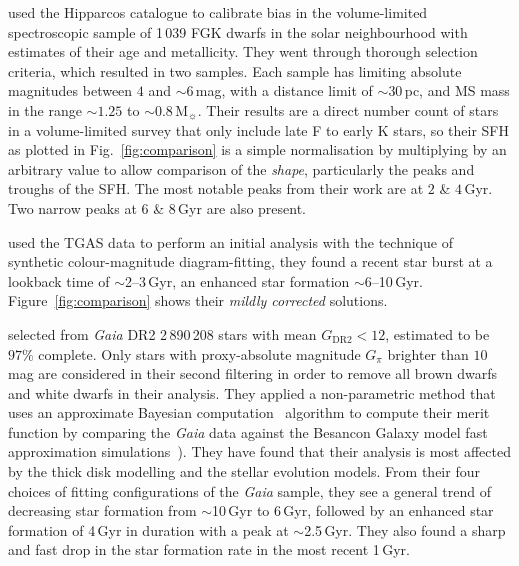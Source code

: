 \documentclass[fleqn,usenatbib]{mnras}
\begin{document}
\citet{2007ApJ...665..767R} used the Hipparcos catalogue to calibrate
bias in the \citet{2005ApJS..159..141V} volume-limited spectroscopic
sample of 1\,039 FGK dwarfs in the solar neighbourhood with estimates of
their age and metallicity. They went through thorough selection criteria,
which resulted in two samples. Each sample has limiting absolute magnitudes
between $4$ and $\sim$$6$\,mag, with a distance limit of $\sim$$30$\,pc, and MS mass
in the range $\sim1.25$ to $\sim0.8$\,M$_{\sun}$. Their results are a direct
number count of stars in a volume-limited survey that only include late F to
early K stars, so their SFH as plotted in Fig.~\ref{fig:comparison} is a simple
normalisation by multiplying by an arbitrary value to allow comparison of the
\textit{shape}, particularly the peaks and troughs of the SFH. The most notable
peaks from their work are at $2$ \& $4$\,Gyr. Two narrow peaks at $6$ \&
$8$\,Gyr are also present.

\citet{2018IAUS..330..148B} used the TGAS data to perform an initial
analysis with the technique of synthetic colour-magnitude diagram-fitting, they
found a recent star burst at a lookback time of $\sim$2--3\,Gyr, an enhanced
star formation $\sim$6--10\,Gyr. Figure~\ref{fig:comparison} shows their
\textit{mildly corrected} solutions.

\citet{2019A&A...624L...1M} selected from \textit{Gaia} DR2 2\,890\,208 stars
with mean $G_{\mathrm{DR2}}<12$, estimated to be $97\%$ complete. Only stars
with proxy-absolute magnitude $G_{\pi}$ brighter than $10$\,mag are considered in
their second filtering in order to remove all brown dwarfs and white dwarfs in
their analysis. They applied a non-parametric method that uses an approximate
Bayesian computation~\citep{2017A&C....19...16J} algorithm to compute their
merit function by comparing the \textit{Gaia} data against the Besancon Galaxy model
fast approximation simulations~\citep{2018A&A...620A..79M}). They have found
that their analysis is most affected by the thick disk modelling and the
stellar evolution models. From their four choices of fitting configurations of
the \textit{Gaia} sample, they see a general trend of decreasing star formation from
$\sim$10\,Gyr to 6\,Gyr, followed by an enhanced star formation of 4\,Gyr in
duration with a peak at $\sim$2.5\,Gyr. They also found a sharp and fast drop
in the star formation rate in the most recent 1\,Gyr.
\end{document}
